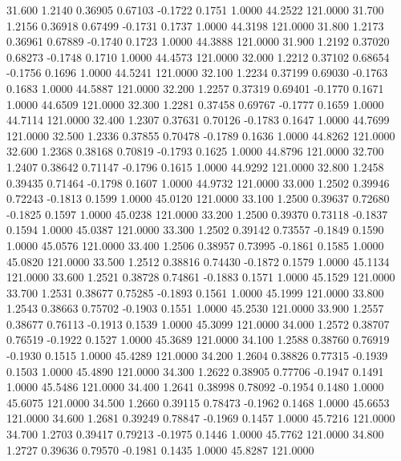   31.600   1.2140   0.36905   0.67103  -0.1722   0.1751   1.0000  44.2522 121.0000
  31.700   1.2156   0.36918   0.67499  -0.1731   0.1737   1.0000  44.3198 121.0000
  31.800   1.2173   0.36961   0.67889  -0.1740   0.1723   1.0000  44.3888 121.0000
  31.900   1.2192   0.37020   0.68273  -0.1748   0.1710   1.0000  44.4573 121.0000
  32.000   1.2212   0.37102   0.68654  -0.1756   0.1696   1.0000  44.5241 121.0000
  32.100   1.2234   0.37199   0.69030  -0.1763   0.1683   1.0000  44.5887 121.0000
  32.200   1.2257   0.37319   0.69401  -0.1770   0.1671   1.0000  44.6509 121.0000
  32.300   1.2281   0.37458   0.69767  -0.1777   0.1659   1.0000  44.7114 121.0000
  32.400   1.2307   0.37631   0.70126  -0.1783   0.1647   1.0000  44.7699 121.0000
  32.500   1.2336   0.37855   0.70478  -0.1789   0.1636   1.0000  44.8262 121.0000
  32.600   1.2368   0.38168   0.70819  -0.1793   0.1625   1.0000  44.8796 121.0000
  32.700   1.2407   0.38642   0.71147  -0.1796   0.1615   1.0000  44.9292 121.0000
  32.800   1.2458   0.39435   0.71464  -0.1798   0.1607   1.0000  44.9732 121.0000
  33.000   1.2502   0.39946   0.72243  -0.1813   0.1599   1.0000  45.0120 121.0000
  33.100   1.2500   0.39637   0.72680  -0.1825   0.1597   1.0000  45.0238 121.0000
  33.200   1.2500   0.39370   0.73118  -0.1837   0.1594   1.0000  45.0387 121.0000
  33.300   1.2502   0.39142   0.73557  -0.1849   0.1590   1.0000  45.0576 121.0000
  33.400   1.2506   0.38957   0.73995  -0.1861   0.1585   1.0000  45.0820 121.0000
  33.500   1.2512   0.38816   0.74430  -0.1872   0.1579   1.0000  45.1134 121.0000
  33.600   1.2521   0.38728   0.74861  -0.1883   0.1571   1.0000  45.1529 121.0000
  33.700   1.2531   0.38677   0.75285  -0.1893   0.1561   1.0000  45.1999 121.0000
  33.800   1.2543   0.38663   0.75702  -0.1903   0.1551   1.0000  45.2530 121.0000
  33.900   1.2557   0.38677   0.76113  -0.1913   0.1539   1.0000  45.3099 121.0000
  34.000   1.2572   0.38707   0.76519  -0.1922   0.1527   1.0000  45.3689 121.0000
  34.100   1.2588   0.38760   0.76919  -0.1930   0.1515   1.0000  45.4289 121.0000
  34.200   1.2604   0.38826   0.77315  -0.1939   0.1503   1.0000  45.4890 121.0000
  34.300   1.2622   0.38905   0.77706  -0.1947   0.1491   1.0000  45.5486 121.0000
  34.400   1.2641   0.38998   0.78092  -0.1954   0.1480   1.0000  45.6075 121.0000
  34.500   1.2660   0.39115   0.78473  -0.1962   0.1468   1.0000  45.6653 121.0000
  34.600   1.2681   0.39249   0.78847  -0.1969   0.1457   1.0000  45.7216 121.0000
  34.700   1.2703   0.39417   0.79213  -0.1975   0.1446   1.0000  45.7762 121.0000
  34.800   1.2727   0.39636   0.79570  -0.1981   0.1435   1.0000  45.8287 121.0000
